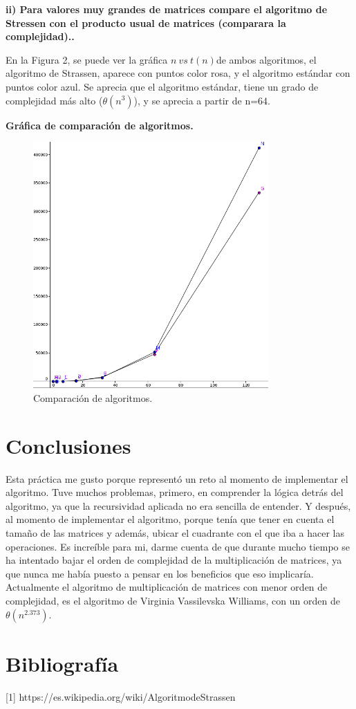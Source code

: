 \documentclass[12pt]{report}
\begin{document}
	\textbf{ii) Para valores muy grandes de matrices compare el algoritmo de Stressen con el	producto usual de matrices (comparara la complejidad)..}\newline
		
	En la Figura 2, se puede ver la gráfica $n \ vs \ t(n)$de ambos algoritmos, el algoritmo de Strassen, aparece con puntos color rosa, y el algoritmo estándar con puntos color azul. Se aprecia que el algoritmo estándar, tiene un grado de complejidad más alto ($\theta (n^3)$), y se aprecia a partir de n=64.\newline
	
	\textbf{Gráfica de comparación de algoritmos.\\}
	\begin{figure}[H]
		\includegraphics[width=9cm]{imagenes/2.png}
		\centering
		\caption{Comparación de algoritmos.}
		\centering
	\end{figure}
	\newpage
	
\section{Conclusiones}
Esta práctica me gusto porque representó un reto al momento de implementar el algoritmo. Tuve muchos problemas, primero, en comprender la lógica detrás del algoritmo, ya que la recursividad aplicada no era sencilla de entender. Y después, al momento de implementar el algoritmo, porque tenía que tener en cuenta el tamaño de las matrices y además, ubicar el cuadrante con el que iba a hacer las operaciones.\newline
Es increíble para mi, darme cuenta de que durante mucho tiempo se ha intentado bajar el orden de complejidad de la multiplicación de matrices, ya que nunca me había puesto a pensar en los beneficios que eso implicaría. Actualmente el algoritmo de multiplicación de matrices con menor orden de complejidad, es el algoritmo de Virginia Vassilevska Williams, con un orden de $\theta (n^{2.373})$.

\section{Bibliografía}

[1] https://es.wikipedia.org/wiki/AlgoritmodeStrassen
	
\end{document}
